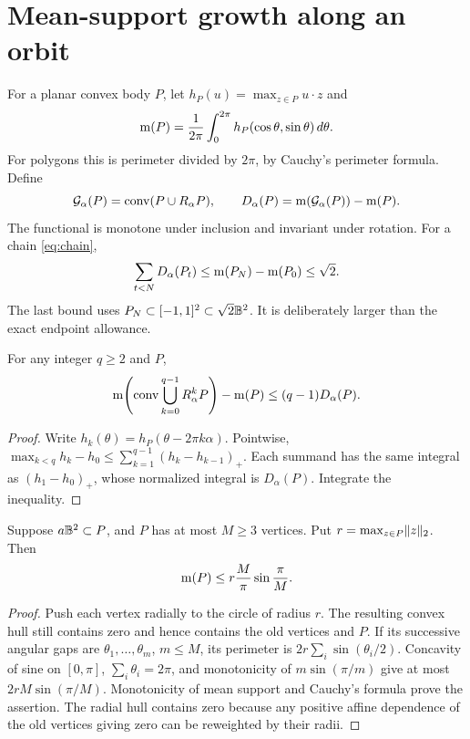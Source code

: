 \section{Mean-support growth along an orbit}\label{sec:mean}
For a planar convex body $P$, let $h_P(u)=\max_{z\in P}u\cdot z$ and
\[
 \operatorname{m}(P)=\frac1{2\pi}\int_0^{2\pi}h_P(\cos\theta,\sin\theta)\,d\theta.
\]
For polygons this is perimeter divided by $2\pi$, by Cauchy's perimeter
formula. Define
\[
 \mathcal G_\alpha(P)=\operatorname{conv}(P\cup R_\alpha P),\qquad
 D_\alpha(P)=\operatorname{m}(\mathcal G_\alpha(P))-\operatorname{m}(P).
\]
The functional is monotone under inclusion and invariant under rotation.
For a chain \eqref{eq:chain},
\begin{equation}\label{eq:mean-budget}
 \sum_{t<N}D_\alpha(P_t)
 \le\operatorname{m}(P_N)-\operatorname{m}(P_0)\le\sqrt2.
\end{equation}
The last bound uses $P_N\subset[-1,1]^2\subset\sqrt2\mathbb B^2$.
It is deliberately larger than the exact endpoint allowance.

\begin{lemma}\label{lem:accumulation}
For any integer $q\ge2$ and $P$,
\begin{equation}\label{eq:orbit-sum}
 \operatorname{m}\!\left(\operatorname{conv}\bigcup_{k=0}^{q-1}R_\alpha^k P\right)-\operatorname{m}(P)
                          \le(q-1)D_\alpha(P).
\end{equation}
\end{lemma}
\begin{proof}
Write $h_k(\theta)=h_P(\theta-2\pi k\alpha)$. Pointwise,
$\max_{k<q}h_k-h_0\le\sum_{k=1}^{q-1}(h_k-h_{k-1})_+$.
Each summand has the same integral as $(h_1-h_0)_+$, whose normalized
integral is $D_\alpha(P)$. Integrate the inequality.
\end{proof}

\begin{lemma}\label{lem:perimeter}
Suppose $a\mathbb B^2\subset P$, and $P$ has at most $M\ge3$ vertices.
Put $r=\max_{z\in P}\lVert z\rVert_2$. Then
\begin{equation}\label{eq:perimeter}
                 \operatorname{m}(P)\le r\frac M\pi\sin\frac\pi M.
\end{equation}
\end{lemma}
\begin{proof}
Push each vertex radially to the circle of radius $r$. The resulting
convex hull still contains zero and hence contains the old vertices and
$P$. If its successive angular gaps are $\theta_1,\ldots,\theta_m$,
$m\le M$, its perimeter is $2r\sum_i\sin(\theta_i/2)$.
Concavity of sine on $[0,\pi]$, $\sum_i\theta_i=2\pi$, and monotonicity
of $m\sin(\pi/m)$ give at most $2rM\sin(\pi/M)$.
Monotonicity of mean support and Cauchy's formula prove the assertion.
The radial hull contains zero because any positive affine dependence
of the old vertices giving zero can be reweighted by their radii.
\end{proof}

